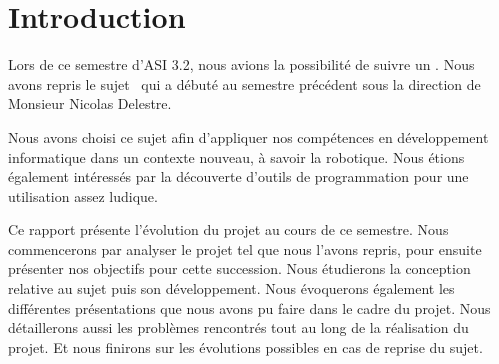 \section{Introduction}
\label{sec:Introduction}

\par Lors de ce semestre d'ASI 3.2, nous avions la possibilité de suivre un \pao.
Nous avons repris le sujet \projet\ qui a débuté au semestre précédent sous la direction de Monsieur Nicolas Delestre.

\par Nous avons choisi ce sujet afin d'appliquer nos compétences en développement informatique dans un contexte nouveau, à savoir la robotique.
Nous étions également intéressés par la découverte d'outils de programmation pour une utilisation assez ludique.

\par Ce rapport présente l'évolution du projet au cours de ce semestre.
Nous commencerons par analyser le projet tel que nous l'avons repris, pour ensuite présenter nos objectifs pour cette succession.
Nous étudierons la conception relative au sujet puis son développement. Nous évoquerons également les différentes présentations que nous avons pu faire dans le cadre du projet.
Nous détaillerons aussi les problèmes rencontrés tout au long de la réalisation du projet.
Et nous finirons sur les évolutions possibles en cas de reprise du sujet.


\pagebreak
